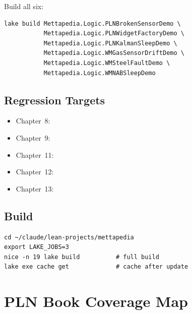\documentclass[11pt,openany]{report}
\begin{document}
\noindent
Build all six:
\begin{lstlisting}
lake build Mettapedia.Logic.PLNBrokenSensorDemo \
           Mettapedia.Logic.PLNWidgetFactoryDemo \
           Mettapedia.Logic.PLNKalmanSleepDemo \
           Mettapedia.Logic.WMGasSensorDriftDemo \
           Mettapedia.Logic.WMSteelFaultDemo \
           Mettapedia.Logic.WMNABSleepDemo
\end{lstlisting}

\section{Regression Targets}

\begin{itemize}
\item Chapter~8: 
\item Chapter~9: 
\item Chapter~11: 
\item Chapter~12: 
\item Chapter~13: 
\end{itemize}

\section{Build}

\begin{lstlisting}
cd ~/claude/lean-projects/mettapedia
export LAKE_JOBS=3
nice -n 19 lake build          # full build
lake exe cache get             # cache after update
\end{lstlisting}


\chapter{PLN Book Coverage Map}
\label{app:coverage-map}
\end{document}
